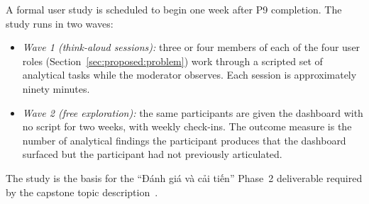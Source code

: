 A formal user study is scheduled to begin one week after P9
completion. The study runs in two waves:

\begin{itemize}
\item \emph{Wave 1 (think-aloud sessions):} three or four
    members of each of the four user roles
    (Section~\ref{sec:proposed:problem}) work through a
    scripted set of analytical tasks while the moderator
    observes. Each session is approximately ninety minutes.
\item \emph{Wave 2 (free exploration):} the same participants
    are given the dashboard with no script for two weeks, with
    weekly check-ins. The outcome measure is the number of
    analytical findings the participant produces that the
    dashboard surfaced but the participant had not previously
    articulated.
\end{itemize}

The study is the basis for the ``Đánh giá và cải tiến''
Phase~2 deliverable required by the capstone topic
description~\cite{capstoneDescription}.
